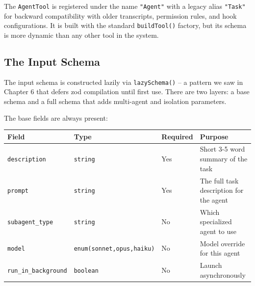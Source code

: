 \documentclass[
  english,
  11pt,
  letterpaper,
]{book}
\begin{document}
The \texttt{AgentTool} is registered under the name \texttt{"Agent"}
with a legacy alias \texttt{"Task"} for backward compatibility with
older transcripts, permission rules, and hook configurations. It is
built with the standard \texttt{buildTool()} factory, but its schema is
more dynamic than any other tool in the system.

\subsection{The Input Schema}\label{the-input-schema}

The input schema is constructed lazily via \texttt{lazySchema()} -- a
pattern we saw in Chapter 6 that defers zod compilation until first use.
There are two layers: a base schema and a full schema that adds
multi-agent and isolation parameters.

The base fields are always present:

\begin{longtable}[]{@{}
  >{\raggedright\arraybackslash}p{}
  >{\raggedright\arraybackslash}p{}
  >{\raggedright\arraybackslash}p{}
  >{\raggedright\arraybackslash}p{}@{}}
\toprule\noalign{}
\begin{minipage}[b]{\linewidth}\raggedright
Field
\end{minipage} & \begin{minipage}[b]{\linewidth}\raggedright
Type
\end{minipage} & \begin{minipage}[b]{\linewidth}\raggedright
Required
\end{minipage} & \begin{minipage}[b]{\linewidth}\raggedright
Purpose
\end{minipage} \\
\midrule\noalign{}
\endhead
\bottomrule\noalign{}
\endlastfoot
\texttt{description} & \texttt{string} & Yes & Short 3-5 word summary of
the task \\
\texttt{prompt} & \texttt{string} & Yes & The full task description for
the agent \\
\texttt{subagent\_type} & \texttt{string} & No & Which specialized agent
to use \\
\texttt{model} &
\texttt{enum(\textquotesingle{}sonnet\textquotesingle{},\textquotesingle{}opus\textquotesingle{},\textquotesingle{}haiku\textquotesingle{})}
& No & Model override for this agent \\
\texttt{run\_in\_background} & \texttt{boolean} & No & Launch
asynchronously \\
\end{longtable}
\end{document}

